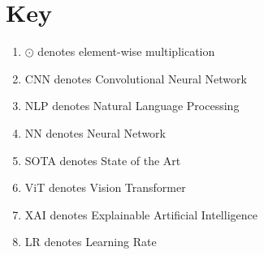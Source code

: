 \chapter*{Key}

\begin{enumerate}
    \item $\odot$ denotes element-wise multiplication
    \item CNN denotes Convolutional Neural Network
    \item NLP denotes Natural Language Processing
    \item NN denotes Neural Network
    \item SOTA denotes State of the Art
    \item ViT denotes Vision Transformer
    \item XAI denotes Explainable Artificial Intelligence
    \item LR denotes Learning Rate
\end{enumerate}